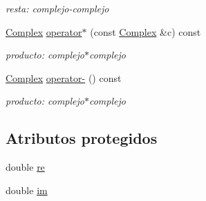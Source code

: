 \begin{CompactItemize}
\begin{CompactList}\small\item\em resta: complejo-complejo \item\end{CompactList}\item 
\hyperlink{classComplex}{Complex} \hyperlink{classComplex_86f4398baa4ea8b9b52c39ad66f0a763}{operator$\ast$} (const \hyperlink{classComplex}{Complex} \&c) const 
\begin{CompactList}\small\item\em producto: complejo$\ast$complejo \item\end{CompactList}\item 
\hyperlink{classComplex}{Complex} \hyperlink{classComplex_9a4a427e85873a2c7ffb2f0dd80e48bc}{operator-} () const 
\begin{CompactList}\small\item\em producto: complejo$\ast$complejo \item\end{CompactList}\end{CompactItemize}
\subsection*{Atributos protegidos}
\begin{CompactItemize}
\item 
double \hyperlink{classComplex_843ce2f85af4c57db9063c86f3cd9607}{re}
\item 
double \hyperlink{classComplex_776d595d5a1b576e9136cbc6bac0589c}{im}
\end{CompactItemize}
